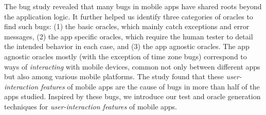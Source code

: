 
The bug study revealed that many bugs in mobile apps have shared roots beyond the application logic. It further helped us identify three categories of oracles to find such bugs: (1) the basic oracles, which mainly catch exceptions and error messages, (2) the app specific oracles, which require the human tester to detail the intended behavior in each case,
and (3) the app agnostic oracles. The app agnostic oracles mostly (with the exception of time zone bugs) correspond to ways of \emph{interacting} with mobile devices, common not only between different apps but also among various mobile platforms. The study found that these \emph{user-interaction features} of mobile apps are the cause of bugs in more than half of the apps studied.  Inspired by these bugs, we introduce our test and oracle generation techniques for \emph{user-interaction features} of mobile apps.
